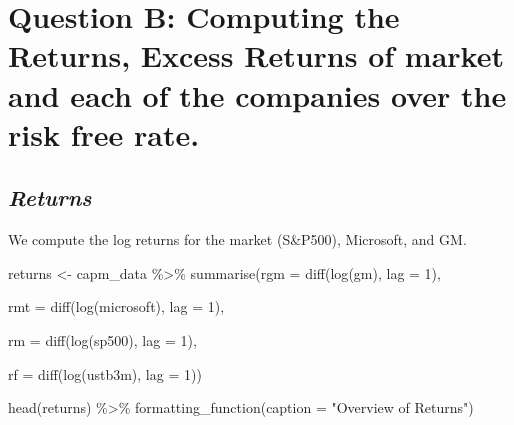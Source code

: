 \documentclass[
]{article}
\newenvironment{Shaded}{\begin{snugshade}}{\end{snugshade}}
\newcommand{\AttributeTok}[1]{\textcolor[rgb]{0.77,0.63,0.00}{#1}}
\newcommand{\DecValTok}[1]{\textcolor[rgb]{0.00,0.00,0.81}{#1}}
\newcommand{\FunctionTok}[1]{\textcolor[rgb]{0.00,0.00,0.00}{#1}}
\newcommand{\NormalTok}[1]{#1}
\newcommand{\OtherTok}[1]{\textcolor[rgb]{0.56,0.35,0.01}{#1}}
\newcommand{\SpecialCharTok}[1]{\textcolor[rgb]{0.00,0.00,0.00}{#1}}
\newcommand{\StringTok}[1]{\textcolor[rgb]{0.31,0.60,0.02}{#1}}
\begin{document}
\hypertarget{question-b-computing-the-returns-excess-returns-of-market-and-each-of-the-companies-over-the-risk-free-rate.}{%
\section{\texorpdfstring{\textbf{Question B: Computing the Returns,
Excess Returns of market and each of the companies over the risk free
rate.}}{Question B: Computing the Returns, Excess Returns of market and each of the companies over the risk free rate.}}\label{question-b-computing-the-returns-excess-returns-of-market-and-each-of-the-companies-over-the-risk-free-rate.}}

\hypertarget{returns}{%
\subsection{\texorpdfstring{\textbf{\emph{Returns}}}{Returns}}\label{returns}}

We compute the log returns for the market (S\&P500), Microsoft, and GM.

\begin{Shaded}
\begin{Highlighting}[]
\NormalTok{returns }\OtherTok{\textless{}{-}}\NormalTok{ capm\_data }\SpecialCharTok{\%\textgreater{}\%} 
    \FunctionTok{summarise}\NormalTok{(}\AttributeTok{rgm =} \FunctionTok{diff}\NormalTok{(}\FunctionTok{log}\NormalTok{(gm), }\AttributeTok{lag =} \DecValTok{1}\NormalTok{),}
              
              \AttributeTok{rmt =} \FunctionTok{diff}\NormalTok{(}\FunctionTok{log}\NormalTok{(microsoft), }\AttributeTok{lag =} \DecValTok{1}\NormalTok{),}
              
              \AttributeTok{rm =} \FunctionTok{diff}\NormalTok{(}\FunctionTok{log}\NormalTok{(sp500), }\AttributeTok{lag =} \DecValTok{1}\NormalTok{),}
              
              \AttributeTok{rf =} \FunctionTok{diff}\NormalTok{(}\FunctionTok{log}\NormalTok{(ustb3m), }\AttributeTok{lag =} \DecValTok{1}\NormalTok{)) }

\FunctionTok{head}\NormalTok{(returns) }\SpecialCharTok{\%\textgreater{}\%} 
    \FunctionTok{formatting\_function}\NormalTok{(}\AttributeTok{caption =}  \StringTok{"Overview of Returns"}\NormalTok{)}
\end{Highlighting}
\end{Shaded}
\end{document}
